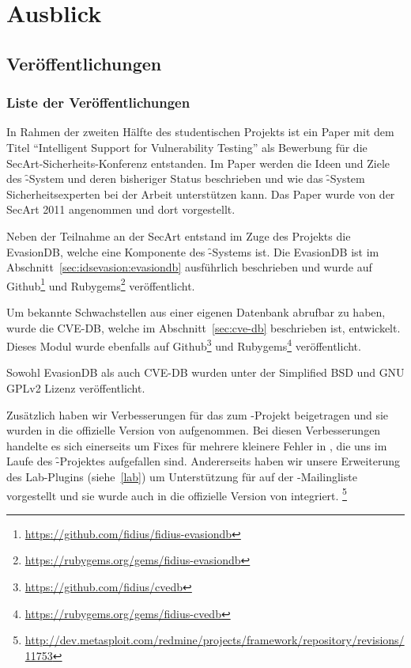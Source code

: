 \chapter{Ausblick}
\label{chp:outlook}

\section{Veröffentlichungen}
\authors{\AB \and \DH}{\HM \and \DE}

\subsection{Liste der Veröffentlichungen} %
In Rahmen der zweiten Hälfte des studentischen Projekts ist ein
Paper\cite{fidiuspaper} mit dem Titel \enquote{Intelligent Support
for Vulnerability Testing} als Bewerbung für die SecArt-Sicherheits-Konferenz
entstanden. Im Paper werden die Ideen und Ziele des \f-System und deren
bisheriger Status beschrieben und wie das \f-System Sicherheitsexperten bei
der Arbeit unterstützen kann. Das Paper wurde von der
SecArt 2011 angenommen und dort vorgestellt.

Neben der Teilnahme an der SecArt entstand im Zuge des Projekts die
EvasionDB, welche eine Komponente des
\f-Systems ist. Die EvasionDB ist im
Abschnitt~\ref{sec:idsevasion:evasiondb} ausführlich beschrieben und
wurde auf
Github\footnote{\url{https://github.com/fidius/fidius-evasiondb}} und
Rubygems\footnote{\url{https://rubygems.org/gems/fidius-evasiondb}}
veröffentlicht.

Um bekannte Schwachstellen aus einer eigenen Datenbank abrufbar zu
haben, wurde die CVE-DB, welche im Abschnitt~\ref{sec:cve-db}
beschrieben ist, entwickelt. Dieses Modul wurde ebenfalls auf
Github\footnote{\url{https://github.com/fidius/cvedb}} und
Rubygems\footnote{\url{https://rubygems.org/gems/fidius-cvedb}}
veröffentlicht.

Sowohl EvasionDB als auch CVE-DB wurden unter der Simplified BSD und GNU
GPLv2 Lizenz veröffentlicht.

Zusätzlich haben wir Verbesserungen für das  zum -Projekt
beigetragen und sie wurden in die offizielle Version von  aufgenommen.
Bei diesen Verbesserungen handelte es sich einerseits um Fixes für mehrere
kleinere Fehler in , die uns im Laufe des \f-Projektes aufgefallen sind.
Andererseits haben wir unsere Erweiterung des Lab-Plugins (siehe~\ref{lab})
um Unterstützung für  auf der -Mailingliste vorgestellt
und sie wurde auch in die offizielle Version von  integriert.
\footnote{\url{http://dev.metasploit.com/redmine/projects/framework/repository/revisions/11753}}

